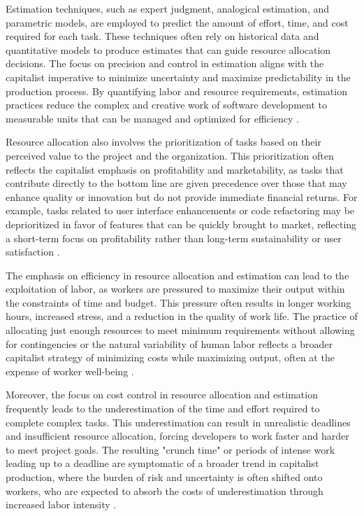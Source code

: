 \begin{refsection}
Estimation techniques, such as expert judgment, analogical estimation, and parametric models, are employed to predict the amount of effort, time, and cost required for each task. These techniques often rely on historical data and quantitative models to produce estimates that can guide resource allocation decisions. The focus on precision and control in estimation aligns with the capitalist imperative to minimize uncertainty and maximize predictability in the production process. By quantifying labor and resource requirements, estimation practices reduce the complex and creative work of software development to measurable units that can be managed and optimized for efficiency \cite[pp.~112-115]{Cohn2005AgileEstimating}.

Resource allocation also involves the prioritization of tasks based on their perceived value to the project and the organization. This prioritization often reflects the capitalist emphasis on profitability and marketability, as tasks that contribute directly to the bottom line are given precedence over those that may enhance quality or innovation but do not provide immediate financial returns. For example, tasks related to user interface enhancements or code refactoring may be deprioritized in favor of features that can be quickly brought to market, reflecting a short-term focus on profitability rather than long-term sustainability or user satisfaction \cite[pp.~99-102]{Humphrey1989ManagingSoftwareProcess}.

The emphasis on efficiency in resource allocation and estimation can lead to the exploitation of labor, as workers are pressured to maximize their output within the constraints of time and budget. This pressure often results in longer working hours, increased stress, and a reduction in the quality of work life. The practice of allocating just enough resources to meet minimum requirements without allowing for contingencies or the natural variability of human labor reflects a broader capitalist strategy of minimizing costs while maximizing output, often at the expense of worker well-being \cite[pp.~188-191]{Weinberg1998PSP}.

Moreover, the focus on cost control in resource allocation and estimation frequently leads to the underestimation of the time and effort required to complete complex tasks. This underestimation can result in unrealistic deadlines and insufficient resource allocation, forcing developers to work faster and harder to meet project goals. The resulting "crunch time" or periods of intense work leading up to a deadline are symptomatic of a broader trend in capitalist production, where the burden of risk and uncertainty is often shifted onto workers, who are expected to absorb the costs of underestimation through increased labor intensity \cite[pp.~45-47]{Brooks1995MythicalManMonth}.


\end{refsection}
